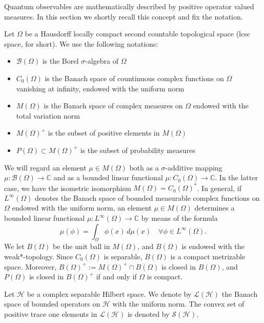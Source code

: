 \documentclass[12pt]{amsart}
\theoremstyle{definition}
\newcommand{\C}{\mathbb C} %
\newcommand{\hi}{\mathcal{H}} %
\newcommand{\lh}{\mathcal{L(H)}} %
\newcommand{\sh}{\mathcal{S(H)}} %
\newcommand{\bor}[1]{\mathcal{B}(#1)} %
\newcommand{\linf}[1]{L^\infty \left( #1 \right)}
\newcommand{\de}{\, d}
\newcommand{\frecc}{\rightarrow}
\begin{document}
Quantum observables are mathematically described by positive operator valued measures.
In this section we shortly recall this concept and fix the notation.

Let $\Omega$ be a Hausdorff locally compact second countable topological
space (lcsc space, for short). We use the following notations:
\begin{itemize}
\item $\bor{\Omega}$ is the Borel $\sigma$-algebra of $\Omega$
\item $C_0 (\Omega)$ is the Banach space of countinuous complex functions on
$\Omega$ vanishing at infinity, endowed with the
uniform norm
\item $M(\Omega)$ is the Banach space of complex measures on $\Omega$ endowed with the total variation norm
\item $M(\Omega)^+$ is the subset of positive elements in $M(\Omega)$
\item $P(\Omega)\subset M(\Omega)^+$ is the subset of probability measures
\end{itemize}

We will regard an element $\mu\in M(\Omega)$ both as a $\sigma$-additive mapping
$\mu : \bor{\Omega} \frecc \C$ and as a bounded linear functional
$\mu : C_0 (\Omega) \frecc \C$. In the latter case, we have the isometric isomorphism $M(\Omega) = C_0 (\Omega)^\ast$. In general, if $\linf{\Omega}$ denotes the Banach space of bounded measurable complex functions on $\Omega$ endowed with the uniform norm, an element $\mu\in M(\Omega)$ determines a bounded linear
functional $\mu : \linf{\Omega} \frecc \C$ by means of the formula
\begin{equation*}
\mu (\phi) = \int_\Omega \phi ( x) \de \mu ( x) \quad \forall \phi \in \linf{\Omega} .
\end{equation*}
We let $B(\Omega)$ be the unit ball in $M(\Omega)$, and $B(\Omega)$ is endowed with the weak*-topology. Since $C_0 (\Omega)$ is separable, $B(\Omega)$ is a compact metrizable space. Moreover, $B(\Omega)^+ := M(\Omega)^+ \cap B(\Omega)$ is closed in $B(\Omega)$, and  $P(\Omega)$ is closed in $B(\Omega)^+$ if and only if $\Omega$ is compact.

Let $\hi$ be a complex separable Hilbert space. We denote by $\lh$ the Banach space
of bounded operators on $\hi$ with the uniform norm.  The convex set of positive trace one elements in $\lh$ is denoted by $\sh$.
\end{document}
